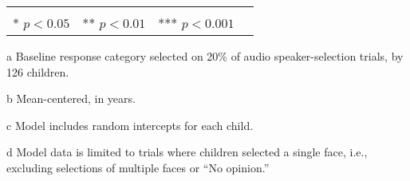 \begin{table}[ht]
\begin{threeparttable}
\begin{tabular}{lllrllllr}
\bottomrule\\[-.75em]
\multicolumn{8}{r}{* $p<0.05$~~** $p<0.01$~~*** $p<0.001$}\\
\end{tabular}
\begin{tablenotes}[flushleft]
    \item[a] Baseline response category selected on 20\% of audio speaker-selection trials, by 126 children. %
    \item[b] Mean-centered, in years.
    \item[c] Model includes random intercepts for each child.
    \item[d] Model data is limited to trials where children selected a single face, i.e., excluding selections of multiple faces or ``No opinion.'' 
\end{tablenotes}
\end{threeparttable}
\end{table}
